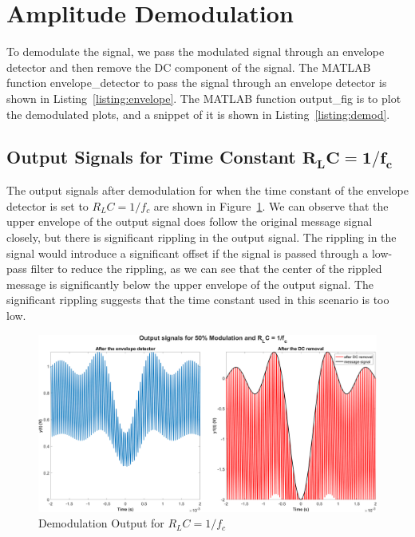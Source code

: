 \documentclass[12pt]{article}
\begin{document}
\section*{Amplitude Demodulation}
To demodulate the signal, we pass the modulated signal through an envelope detector and then remove the DC component of the signal. The MATLAB function envelope\_detector to pass the signal through an envelope detector is shown in Listing~\ref{listing:envelope}. The MATLAB function output\_fig is to plot the demodulated plots, and a snippet of it is shown in Listing~\ref{listing:demod}.



\subsection*{Output Signals for Time Constant $\bm{R_LC = 1/f_c}$}
The output signals after demodulation for when the time constant of the envelope detector is set to $R_LC = 1/f_c$ are shown in Figure~\ref{fig:q2i}. We can observe that the upper envelope of the output signal does follow the original message signal closely, but there is significant rippling in the output signal. The rippling in the signal would introduce a significant offset if the signal is passed through a low-pass filter to reduce the rippling, as we can see that the center of the rippled message is significantly below the upper envelope of the output signal. The significant rippling suggests that the time constant used in this scenario is too low.
\begin{figure}[h!]
    \centering
    \includegraphics[width=\textwidth]{q2i}
    \caption{\label{fig:q2i}Demodulation Output for $R_LC = 1/f_c$}
\end{figure}
\end{document}
